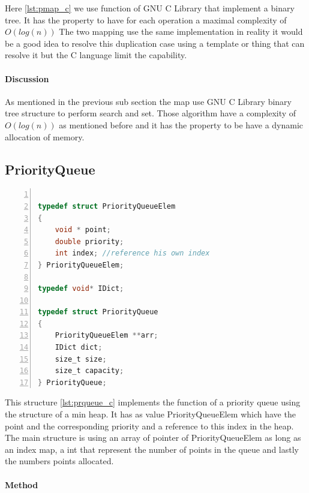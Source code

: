 Here \ref{lst:pmap_c} we use function of GNU C Library that implement a binary tree. It has the property to have for each operation a maximal complexity of $O(log(n))$ The two mapping use the same implementation in reality it would be a good idea to resolve this duplication case using a template or thing that can resolve it but the C language limit the capability.

\paragraph{Discussion}
As mentioned in the previous sub section the map use GNU C Library binary tree structure to perform search and set. Those algorithm have a complexity of $O(log(n))$ as mentioned before and it has the property to be have a dynamic allocation of memory.

\subsection{PriorityQueue}

\begin{lstlisting}[float=h,language=C, % Spécifie le langage du code
caption={PriorityQueue}, % Légende du listing
label=lst:prqueue_c, % Étiquette pour référencer le listing
numbers=left,
numberstyle=\tiny\color{gray},
stepnumber=1,
frame=single,
breaklines=true,
postbreak=\mbox{\textcolor{red}{$\hookrightarrow$}\space},
showstringspaces=false
]

typedef struct PriorityQueueElem
{
	void * point;
	double priority;
	int index; //reference his own index
} PriorityQueueElem;

typedef void* IDict;

typedef struct PriorityQueue
{
	PriorityQueueElem **arr;
	IDict dict;
	size_t size;
	size_t capacity;
} PriorityQueue;

\end{lstlisting} 

This structure \ref{lst:prqueue_c} implements the function of a priority queue using the structure of a min heap. It has as value PriorityQueueElem which have the point and the corresponding priority and a reference to this index in the heap. The main structure is using an array of pointer of PriorityQueueElem as long as an index map, a int that represent the number of points in the queue and lastly the numbers points allocated.

\paragraph{Method}

